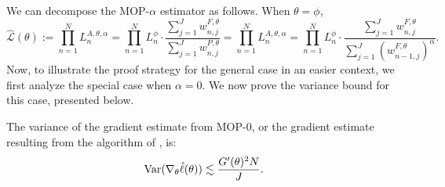 We can decompose the MOP-$\alpha$ estimator as follows. 
When $\theta=\phi$,
\begin{equation}
\hat{\mathcal{L}}(\theta):=\prod_{n=1}^N L_n^{A, \theta, \alpha}=\prod_{n=1}^N L_n^\phi \cdot \frac{\sum_{j=1}^J w_{n, j}^{F, \theta}}{\sum_{j=1}^J w_{n, j}^{P, \theta}}=\prod_{n=1}^N L_n^{A, \theta, \alpha}=\prod_{n=1}^N L_n^\phi \cdot \frac{\sum_{j=1}^J w_{n, j}^{F, \theta}}{\sum_{j=1}^J (w_{n-1, j}^{F, \theta})^\alpha}.
\end{equation}
Now, to illustrate the proof strategy for the general case in an easier context, we first analyze the special case when $\alpha=0.$ We now prove the variance bound for this case, presented below. 

\begin{thm}
The variance of the gradient estimate from MOP-$0$, or the gradient estimate resulting from the algorithm of \cite{naesseth18}, is:
 \begin{equation}
     \mathrm{Var}(\nabla_\theta \hat\ell(\theta)) \lesssim \frac{G'(\theta)^2N}{J}.
 \end{equation}
\end{thm}


